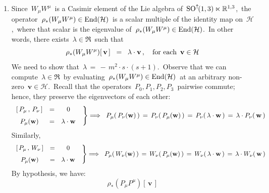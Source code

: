 \begin{enumerate}
\item
	Since \,$W_{\mu}W^{\mu}$\, is a Casimir element of the Lie algebra of
	\,$\textnormal{SO}^{\uparrow\!}(1,3) \ltimes \mathbb{R}^{1,3}$,\,
	the operator
	\,$\rho_{*}(W_{\mu}W^{\mu}) \in \textnormal{End}(\mathcal{H})$\,
	is a scalar multiple of the identity map on \,$\mathcal{H}$,\,
	where that scalar is the eigenvalue of
	\,$\rho_{*}(W_{\mu}W^{\mu}) \in \textnormal{End}(\mathcal{H})$.\,
	In other words, there exists \,$\lambda \in \Re$\, such that
	\begin{equation*}
	\rho_{*}(W_{\mu}W^{\mu})\!\left[\,\mathbf{v}\,\right]
	\;\; = \;\;
		\lambda \cdot \mathbf{v}\,,
	\quad
	\textnormal{for each \,$\mathbf{v} \in \mathcal{H}$}
	\end{equation*}
	We need to show that
	\,$\lambda \,=\, -\,m^{2} \cdot s \cdot (s+1)$.\,
	\vskip 0.1cm
	Observe that we can compute \,$\lambda \in \Re$\, by evaluating
	\,$\rho_{*}(W_{\mu}W^{\mu}) \in \textnormal{End}(\mathcal{H})$\,
	at an arbitrary non-zero \,$\mathbf{v} \in \mathcal{H}$.\,
	\vskip 0.1cm
	Recall that the operators
	\,$P_{0}, P_{1}, P_{2}, P_{3}$\,
	pairwise commute;
	hence, they preserve the eigenvectors of each other:
	\begin{equation*}
	\left.\begin{array}{ccc}
		\left[\,P_{\mu}\,,\,P_{\nu}\,\right] & = & 0
		\\
		\overset{{\color{white}1}}{P_{\mu}(\mathbf{w})} &=& \lambda\cdot\mathbf{w}
		\end{array}
	\;\;\right\}\Longrightarrow\;\;
	P_{\mu}\!\left(\,P_{\nu}(\mathbf{w})\,\right)
	\,=\,
		P_{\nu}\!\left(\,P_{\mu}(\mathbf{w})\,\right)
	\,=\,
		P_{\nu}\!\left(\,\lambda\cdot\mathbf{w}\,\right)
	\,=\,
		\lambda \cdot P_{\nu}(\,\mathbf{w}\,)
	\end{equation*}
	Similarly,
	\begin{equation*}
	\left.\begin{array}{ccc}
		\left[\,P_{\mu}\,,\,W_{\nu}\,\right] & = & 0
		\\
		\overset{{\color{white}1}}{P_{\mu}(\mathbf{w})} &=& \lambda\cdot\mathbf{w}
		\end{array}
	\;\;\right\}\Longrightarrow\;\;
	P_{\mu}\!\left(\,W_{\nu}(\mathbf{w})\,\right)
	\,=\,
		W_{\nu}\!\left(\,P_{\mu}(\mathbf{w})\,\right)
	\,=\,
		W_{\nu}\!\left(\,\lambda\cdot\mathbf{w}\,\right)
	\,=\,
		\lambda \cdot W_{\nu}(\,\mathbf{w}\,)
	\end{equation*}
	\vskip 0.1cm
	By hypothesis, we have:
	\begin{equation*}
	\rho_{*}(P_{\mu}P^{\mu})\!\left[\,\mathbf{v}\,\right]

\end{equation*}
\end{enumerate}
